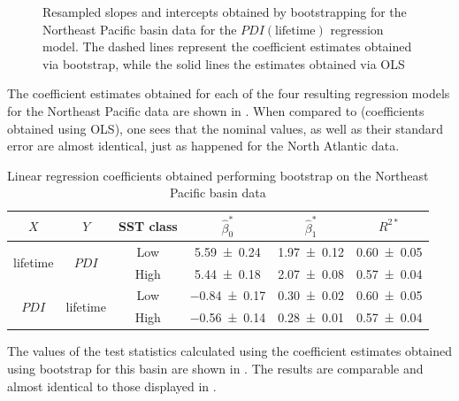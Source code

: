 \begin{figure}[H]
{		\label{fig:epac-boot-slope-qq}%
		}%
	\caption[Resampled slopes and intercepts obtained by bootstrapping for the Northeast Pacific basin data for the $PDI(\text{lifetime})$ regression model]{Resampled slopes and intercepts obtained by bootstrapping for the Northeast Pacific basin data for the $PDI(\text{lifetime})$ regression model. The dashed lines represent the coefficient estimates obtained via bootstrap, while the solid lines the estimates obtained via OLS}
	\label{fig:epac-boot-coefs}
\end{figure}

The coefficient estimates obtained for each of the four resulting regression models for the Northeast Pacific data are shown in . When compared to  (coefficients obtained using OLS), one sees that the nominal values, as well as their standard error are almost identical, just as happened for the North Atlantic data.

\begin{table}[H]
	\centering
	\begin{tabular}{cccccc}
		\toprule
		\toprule
		$X$ & $Y$ & SST class & $\hat{\beta}_{0}^{\ast}$ & $\hat{\beta}_{1}^{\ast}$ & $R^{2\ast}$ \\
		\midrule
		\multirow{2}{*}{lifetime} & \multirow{2}{*}{$PDI$}
		 & Low  & \num{ 5.59 \pm 0.24} & \num{1.97 \pm 0.12} & \num{0.60 \pm 0.05} \\
		&& High & \num{ 5.44 \pm 0.18} & \num{2.07 \pm 0.08} & \num{0.57 \pm 0.04} \\
		\midrule
		\multirow{2}{*}{$PDI$} & \multirow{2}{*}{lifetime}
		 & Low  & \num{-0.84 \pm 0.17} & \num{0.30 \pm 0.02} & \num{0.60 \pm 0.05} \\
		&& High & \num{-0.56 \pm 0.14} & \num{0.28 \pm 0.01} & \num{0.57 \pm 0.04} \\
		\bottomrule
	\end{tabular}
	\caption{Linear regression coefficients obtained performing bootstrap on the Northeast Pacific basin data}
	\label{tab:epac-boot-coefs}
\end{table}

The values of the test statistics calculated using the coefficient estimates obtained using bootstrap for this basin are shown in . The results are comparable and almost identical to those displayed in .

